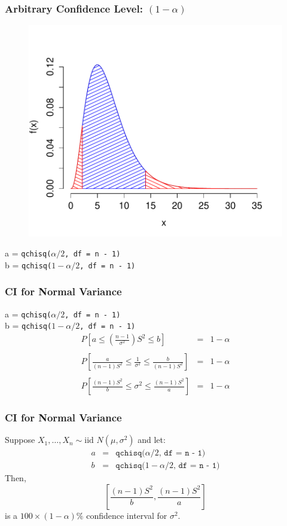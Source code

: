 \documentclass[handout]{beamer}
\begin{document}
\begin{frame}
\frametitle{Arbitrary Confidence Level: $(1-\alpha)$}

\begin{figure}
\centering
\includegraphics[scale = 0.5]{./images/chisq_tails}
\end{figure}

a = \texttt{qchisq($\alpha/2$, df = n - 1)} \\

b = \texttt{qchisq($1-\alpha/2$, df = n - 1)} 
\end{frame}
\begin{frame}
\frametitle{CI for Normal Variance}
a = \texttt{qchisq($\alpha/2$, df = n - 1)} \\
b = \texttt{qchisq($1-\alpha/2$, df = n - 1)} 
\vspace{1em}
 	\begin{eqnarray*}
 		P\left[ a\leq   \left( \frac{n-1}{\sigma^2}\right)S^2 \leq b \right] &=& 1-\alpha \\ \\
 		P\left[ \frac{a}{(n-1)S^2}\leq  \frac{1}{\sigma^2} \leq \frac{b}{(n-1)S^2} \right] &=& 1-\alpha \\ \\ 
 				P\left[ \frac{(n-1)S^2}{b}\leq  \sigma^2 \leq \frac{(n-1)S^2}{a} \right] &=& 1-\alpha
 	\end{eqnarray*}	
\end{frame}
\begin{frame}
\frametitle{CI for Normal Variance}
Suppose $X_1, \hdots, X_n \sim \mbox{iid } N(\mu,\sigma^2)$ and let:
	\begin{eqnarray*}
		a &=& \texttt{qchisq($\alpha/2$, df = n - 1)} \\
		b &=& \texttt{qchisq($1-\alpha/2$, df = n - 1)} 
	\end{eqnarray*}
Then,
	$$\left[ \frac{(n-1)S^2}{b}, \frac{(n-1)S^2}{a} \right]$$
is a $100\times(1-\alpha)\%$ confidence interval for $\sigma^2$.
\end{frame}
\end{document}

